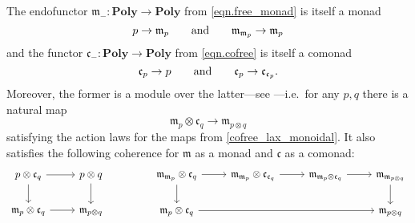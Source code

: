 \documentclass[11pt, one side, article]{memoir}
\theoremstyle{definition}
\theoremstyle{plain}
\newcommand{\Cat}[1]{\mathbf{#1}}%
\newcommand{\To}[2][]{\xrightarrow[#1]{\tn{$#2$}}}
\newcommand{\tn}[1]{\textnormal{#1}}
\newcommand{\smset}{\Cat{Set}}
\newcommand{\yon}{{\mathcal{y}}}
\newcommand{\poly}{\Cat{Poly}}
\newcommand{\0}{\textsf{0}}
\newcommand{\1}{\tn{\textsf{1}}}
\newcommand{\tri}{\mathbin{\triangleleft}}
\newcommand{\cofree}{\mathfrak{c}}
\newcommand{\free}{\mathfrak{m}}
\newcommand{\hh}[2][]{#1 \tn{#2} #1}
\newcommand{\qqand}{\hh[\qquad]{and}}
\begin{document}
The endofunctor $\free_-\colon\poly\to\poly$ from \cref{eqn.free_monad} is itself a monad
\begin{equation}
	p\to\free_p
	\qqand
	\free_{\free_p}\to\free_p
\end{equation}
and the functor $\cofree_-\colon\poly\to\poly$ from \cref{eqn.cofree} is itself a comonad
\begin{equation}
	\cofree_p\to p
	\qqand
	\cofree_p\to\cofree_{\cofree_p}. 
\end{equation}
Moreover, the former is a module over the latter---see \cite{libkind2024pattern}---i.e.\ for any $p,q$ there is a natural map
\begin{equation}\label{module_easy}
  \free_p\otimes\cofree_q\to\free_{p\otimes q}
\end{equation}
satisfying the action laws for the maps from \cref{cofree_lax_monoidal}. It also satisfies the following coherence for $\free$ as a monad and $\cofree$ as a comonad:
\begin{equation}\label{eqn.monad_comonad_coherence}
\begin{tikzcd}
  p\otimes\cofree_q\ar[r]\ar[d]&p\otimes q\ar[d]\\
  \free_p\otimes\cofree_q\ar[r]&\free_{p\otimes q}
\end{tikzcd}
\hspace{.6in}
\begin{tikzcd}
	\free_{\free_p}\otimes\cofree_q\ar[d]\ar[r]&
	\free_{\free_p}\otimes\cofree_{\cofree_q}\ar[r]&
	\free_{\free_p\otimes\cofree_q}\ar[r]&
	\free_{\free_{p\otimes q}}\ar[d]\\
	\free_p\otimes\cofree_q\ar[rrr]&&&
	\free_{p\otimes q}
\end{tikzcd}
\end{equation}
%
%
\end{document}
